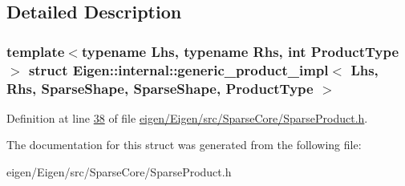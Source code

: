 \subsection{Detailed Description}
\subsubsection*{template$<$typename Lhs, typename Rhs, int Product\+Type$>$\newline
struct Eigen\+::internal\+::generic\+\_\+product\+\_\+impl$<$ Lhs, Rhs, Sparse\+Shape, Sparse\+Shape, Product\+Type $>$}



Definition at line \hyperlink{eigen_2_eigen_2src_2_sparse_core_2_sparse_product_8h_source_l00038}{38} of file \hyperlink{eigen_2_eigen_2src_2_sparse_core_2_sparse_product_8h_source}{eigen/\+Eigen/src/\+Sparse\+Core/\+Sparse\+Product.\+h}.



The documentation for this struct was generated from the following file\+:\begin{DoxyCompactItemize}
\item 
eigen/\+Eigen/src/\+Sparse\+Core/\+Sparse\+Product.\+h\end{DoxyCompactItemize}
